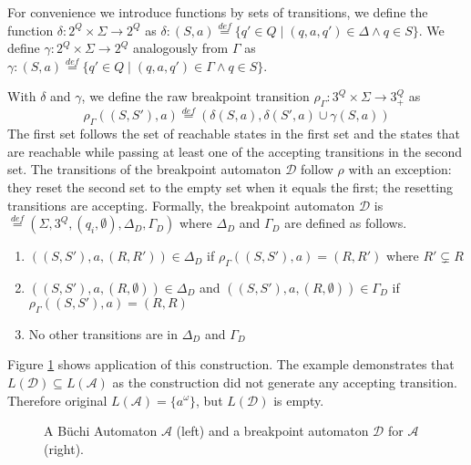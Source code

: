 \documentclass[
	digital,
nolof, nolot
]{fithesis3}
\newcommand{\cA}{\mathcal{A}}
\newcommand{\cD}{\mathcal{D}}
\newcommand{\lA}{L(\cA)}
\newcommand{\lD}{L(\cD)}
\newcommand{\eqdef}{\overset{def}{=}}
\begin{document}
			For convenience we introduce functions by sets of transitions, we define the function $\delta \colon 2^Q \times \Sigma \rightarrow 2^Q$ as 	
			$\delta\colon (S,a)\eqdef\{q'\in Q \mid  (q,a,q') \in \Delta \land q \in S\}$.
			We define $\gamma:2^Q  \times \Sigma \rightarrow 2^Q$ analogously from $\Gamma$ as $\gamma\colon (S,a)\eqdef\{q'\in Q \mid  (q,a,q') \in \Gamma \land q \in S\}$.
			
			
			With $\delta$ and $\gamma$, we define the raw breakpoint transition
			$\rho_\Gamma \colon 3^Q \times \Sigma \rightarrow 3^Q_+$ as
			\[\rho_\Gamma((S, S'), a) \eqdef(\delta(S, a), \delta(S',a)\cup \gamma(S, a))\]
			The first set follows the set of reachable states in the first set and the states that are reachable while passing at least one of the accepting transitions in the second set.
			The transitions of the breakpoint automaton $\cD$ follow $\rho$ with an exception: they reset the second set to the empty set when it equals the first; the resetting transitions are accepting.
			Formally, the breakpoint automaton $\cD$ is $ \eqdef (\Sigma, 3^Q, (q_i, \emptyset), \Delta_D, \Gamma_D)$ where $\Delta_D$ and $\Gamma_D$ are defined as follows. 
			
			\begin{enumerate}
				\item $((S, S'), a, (R, R')) \in \Delta_D$ if $\rho_\Gamma((S,S'),a)=(R,R')$ where $R' \subsetneq R$
				\item \label{reset}$((S, S'), a, (R, \emptyset)) \in \Delta_D$ and $((S, S'), a, (R, \emptyset)) \in \Gamma_D$ if $\rho_\Gamma((S,S'),a)=(R,R)$ 
				\item No other transitions are in $\Delta_D$ and $\Gamma_D$
			\end{enumerate}
			
			Figure \ref{fig:bp:non-equivalent} shows application of this construction. The example demonstrates that $\lD \subseteq \lA$ as the construction did not generate any accepting transition. Therefore original $\lA=\{a^\omega\}$, but $\lD$ is empty. 
			
			
			
			\begin{figure}[ht]
				\begin{center}
					
					
				\end{center}
				\caption{A Büchi Automaton $\cA$ (left) and a breakpoint automaton $\cD$ for $\cA$ (right).}
				\label{fig:bp:non-equivalent}
			\end{figure}
		
\end{document}
